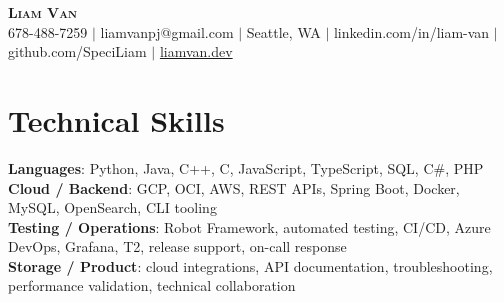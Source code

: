 \documentclass[letterpaper,11pt]{article}
\begin{document}

%
\begin{center}
    \textbf{\Huge \scshape Liam Van} \\ \vspace{1pt}
    \small 678-488-7259 $|$ \small {liamvanpj@gmail.com} $|$ Seattle, WA
 {{$|$ linkedin.com/in/liam-van} {$|$ github.com/SpeciLiam} {$|$ \href{https://liamvan.dev}{liamvan.dev}}}

\end{center}

\section{Technical Skills}
 \begin{itemize}[leftmargin=0.15in, label={}]
    \small{\item{
     \textbf{Languages}{: Python, Java, C++, C, JavaScript, TypeScript, SQL, C\#, PHP} \\
     \textbf{Cloud / Backend}{: GCP, OCI, AWS, REST APIs, Spring Boot, Docker, MySQL, OpenSearch, CLI tooling} \\
     \textbf{Testing / Operations}{: Robot Framework, automated testing, CI/CD, Azure DevOps, Grafana, T2, release support, on-call response} \\
     \textbf{Storage / Product}{: cloud integrations, API documentation, troubleshooting, performance validation, technical collaboration} \\
    }}
 \end{itemize}
%
\end{document}
